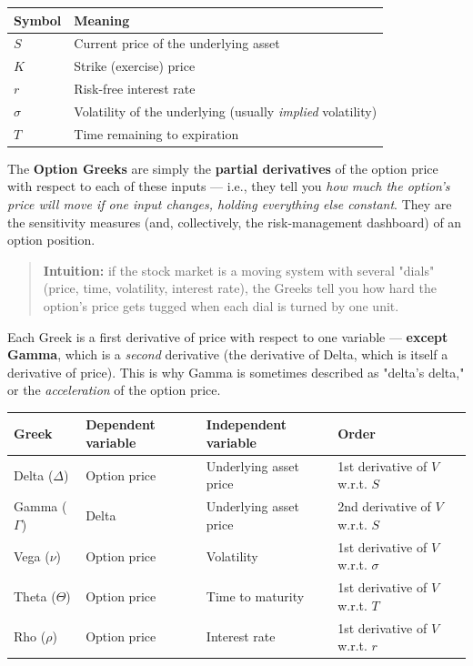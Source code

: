 \documentclass[12pt,openany]{book}
\theoremstyle{definition}
\theoremstyle{remark}
\begin{document}
{\small
\begin{longtable}{@{}L{0.28\textwidth}L{0.64\textwidth}@{}}
\toprule
\textbf{Symbol} & \textbf{Meaning} \\
\midrule
\(S\) & Current price of the underlying asset \\
\(K\) & Strike (exercise) price \\
\(r\) & Risk-free interest rate \\
\(\sigma\) & Volatility of the underlying (usually \emph{implied} volatility) \\
\(T\) & Time remaining to expiration \\
\bottomrule
\end{longtable}
}

The \textbf{Option Greeks} are simply the \textbf{partial derivatives} of the option price with respect to each of these inputs — i.e., they tell you \emph{how much the option's price will move if one input changes, holding everything else constant}. They are the sensitivity measures (and, collectively, the risk-management dashboard) of an option position.

\begin{quote}
\textbf{Intuition:} if the stock market is a moving system with several "dials" (price, time, volatility, interest rate), the Greeks tell you how hard the option's price gets tugged when each dial is turned by one unit.
\end{quote}

Each Greek is a first derivative of price with respect to one variable — \textbf{except Gamma}, which is a \emph{second} derivative (the derivative of Delta, which is itself a derivative of price). This is why Gamma is sometimes described as "delta's delta," or the \emph{acceleration} of the option price.

{\small
\begin{longtable}{@{}L{0.14\textwidth}L{0.25\textwidth}L{0.25\textwidth}L{0.24\textwidth}@{}}
\toprule
\textbf{Greek} & \textbf{Dependent variable} & \textbf{Independent variable} & \textbf{Order} \\
\midrule
Delta (\(\Delta\)) & Option price & Underlying asset price & 1st derivative of \(V\) w.r.t. \(S\) \\
Gamma (\(\Gamma\)) & Delta & Underlying asset price & 2nd derivative of \(V\) w.r.t. \(S\) \\
Vega (\(\nu\)) & Option price & Volatility & 1st derivative of \(V\) w.r.t. \(\sigma\) \\
Theta (\(\Theta\)) & Option price & Time to maturity & 1st derivative of \(V\) w.r.t. \(T\) \\
Rho (\(\rho\)) & Option price & Interest rate & 1st derivative of \(V\) w.r.t. \(r\) \\
\bottomrule
\end{longtable}
}
\end{document}
